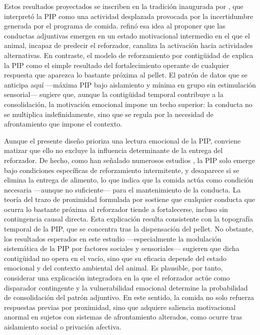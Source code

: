 \documentclass[12pt,a4paper]{article}
\begin{document}
\begin{multicols}{2}
Estos resultados proyectados se inscriben en la tradición inaugurada por \citet{Falk1961}, que interpretó la PIP como una actividad desplazada provocada por la incertidumbre generada por el programa de comida. \citet{Staddon1977} refinó esa idea al proponer que las conductas adjuntivas emergen en un estado motivacional intermedio en el que el animal, incapaz de predecir el reforzador, canaliza la activación hacia actividades alternativas. En contraste, el modelo de reforzamiento por contigüidad de \citet{Killeen2013} explica la PIP como el simple resultado del fortalecimiento operante de cualquier respuesta que aparezca lo bastante próxima al pellet. El patrón de datos que se anticipa aquí —máxima PIP bajo aislamiento y mínima en grupo sin estimulación sensorial— sugiere que, aunque la contigüidad temporal contribuye a la consolidación, la motivación emocional impone un techo superior: la conducta no se multiplica indefinidamente, sino que se regula por la necesidad de afrontamiento que impone el contexto.

Aunque el presente diseño prioriza una lectura emocional de la PIP, conviene matizar que ello no excluye la influencia determinante de la entrega del reforzador. De hecho, como han señalado numerosos estudios \citep{Pellon2004}, la PIP solo emerge bajo condiciones específicas de reforzamiento intermitente, y desaparece si se elimina la entrega de alimento, lo que indica que la comida actúa como condición necesaria —aunque no suficiente— para el mantenimiento de la conducta. La teoría del trazo de proximidad formulada por \citet{Killeen2013} sostiene que cualquier conducta que ocurra lo bastante próxima al reforzador tiende a fortalecerse, incluso sin contingencia causal directa. Esta explicación resulta consistente con la topografía temporal de la PIP, que se concentra tras la dispensación del pellet. No obstante, los resultados esperados en este estudio —especialmente la modulación sistemática de la PIP por factores sociales y sensoriales— sugieren que dicha contigüidad no opera en el vacío, sino que su eficacia depende del estado emocional y del contexto ambiental del animal. Es plausible, por tanto, considerar una explicación integradora en la que el reforzador actúe como disparador contingente y la vulnerabilidad emocional determine la probabilidad de consolidación del patrón adjuntivo. En este sentido, la comida no solo refuerza respuestas previas por proximidad, sino que adquiere saliencia motivacional anormal en sujetos con sistemas de afrontamiento alterados, como ocurre tras aislamiento social o privación afectiva.


\end{multicols}
\end{document}
